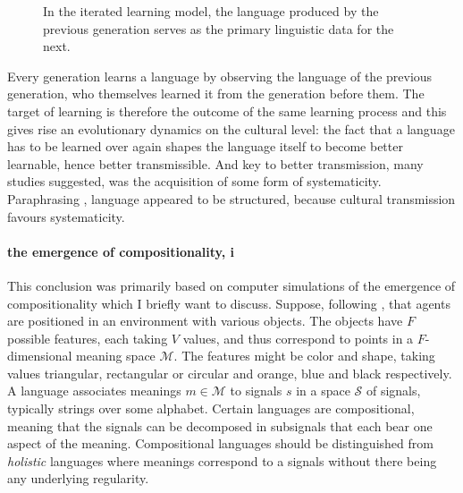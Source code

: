 \documentclass{../src/bcthesispart}
\begin{document}
\begin{SCfigure}
	
	
	\caption{%
	In the iterated learning model, the language produced by the previous generation serves as the primary linguistic data for the next.
	\label{fig:iterated-learning-illustration}}
\end{SCfigure}




Every generation learns a language by observing the language of the previous generation, who themselves learned it from the generation before them.
The target of learning is therefore the outcome of the same learning process and this gives rise an evolutionary dynamics on the cultural level:
the fact that a language has to be learned over again shapes the language itself to become better learnable, hence better transmissible.
And key to better transmission, many studies suggested, was the acquisition of some form of systematicity.
Paraphrasing \textcite{Hurford2000}, language appeared to be structured, because cultural transmission favours systematicity.



\paragraph{the emergence of compositionality, i}

This conclusion was primarily based on computer simulations of the emergence of compositionality which I briefly want to discuss.
Suppose, following \textcite{Brighton2002}, that agents are positioned in an environment with various objects.
The objects have $F$ possible features, each taking $V$ values, and thus correspond to points in a $F$-dimensional meaning space $\mathcal{M}$.
The features might be color and shape, taking values triangular, rectangular or circular and orange, blue and black respectively.
A language associates meanings $m \in \mathcal{M}$ to signals $s$ in a space $\mathcal{S}$ of signals, typically strings over some alphabet.
Certain languages are compositional, meaning that the signals can be decomposed in subsignals that each bear one aspect of the meaning.
Compositional languages should be distinguished from \emph{holistic} languages where meanings correspond to a signals without there being any underlying regularity.
\end{document}
